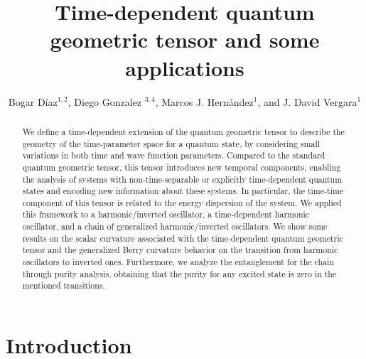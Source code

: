 \documentclass[12pt]{iopart}
\begin{document}
\title{Time-dependent quantum geometric tensor and some applications}

\author{Bogar Díaz$^{1, 2}$, Diego Gonzalez $^{3, 4}$,
Marcos J. Hern\'andez$^{1}$, and
J. David Vergara$^{1}$}
\address{$^1$ Departamento de F\'isica de Altas Energ\'ias, Instituto de Ciencias Nucleares, Universidad Nacional Aut\'onoma de M\'exico, Apartado Postal 70-543, Ciudad de M\'exico, 04510, M\'exico}
\address{$^2$ Group of Biometrics, Biosignals, Security and Smart Mobility (GB2S), Department of Mathematics Applied to Information and Communication Technologies, Universidad Politécnica de Madrid, Avda. Complutense, 30, 28040 Madrid, Spain}
\address{$^3$ Escuela Superior de Ingenier\'ia Mec\'anica y El\'ectrica, Instituto Polit\'ecnico Nacional, Unidad Profesional Adolfo L\'opez Mateos, Zacatenco, 07738 Gustavo A. Madero, Ciudad de M\'exico, M\'exico}
\address{$^4$ Departamento de F\'{i}sica, Cinvestav, Avenida Instituto Polit\'{e}cnico Nacional 2508, San Pedro Zacatenco, 07360 Gustavo A. Madero, Ciudad de M\'exico, M\'exico}



\begin{abstract}
We define a time-dependent extension of the quantum geometric tensor to describe the geometry of the time-parameter space for a quantum state, by considering small variations in both time and wave function parameters. Compared to the standard quantum geometric tensor, this tensor introduces new temporal components, enabling the analysis of systems with non-time-separable or explicitly time-dependent quantum states and encoding new information about these systems. In particular, the time-time component of this tensor is related to the energy dispersion of the system. We applied this framework to a harmonic/inverted oscillator, a time-dependent harmonic oscillator, and a chain of generalized harmonic/inverted oscillators. We show some results on the scalar curvature associated with the time-dependent quantum geometric tensor and the generalized Berry curvature behavior on the transition from harmonic oscillators to inverted ones. Furthermore, we analyze the entanglement for the chain through purity analysis, obtaining that the purity for any excited state is zero in the mentioned transitions.
\end{abstract}


\section{Introduction}\label{sec:level1}
\end{document}
